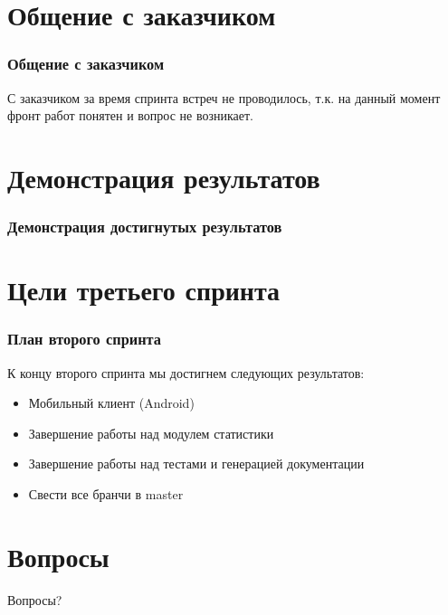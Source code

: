 \documentclass{beamer}
\newlength{\wideitemsep}
\let\olditem\item
\renewcommand{\item}{\setlength{\itemsep}{\wideitemsep}\olditem}
\begin{document}
\section{Общение с заказчиком}

\begin{frame}
\frametitle{Общение с заказчиком}

С заказчиком за время спринта встреч не проводилось, т.к. на данный момент фронт работ понятен и вопрос не возникает.

\end{frame}

\section{Демонстрация результатов}

\begin{frame}
\frametitle{Демонстрация достигнутых результатов}



\end{frame}

\section{Цели третьего спринта}

\begin{frame}
\frametitle{План второго спринта}

К концу второго спринта мы достигнем следующих результатов:
\medskip
\begin{itemize}
\item Мобильный клиент (Android)
\item Завершение работы над модулем статистики
\item Завершение работы над тестами и генерацией документации
\item Свести все бранчи в master
\end{itemize}

\end{frame}

\section{Вопросы}

\begin{frame}
\Huge{\centerline{Вопросы?}}
\end{frame}

\end{document}
